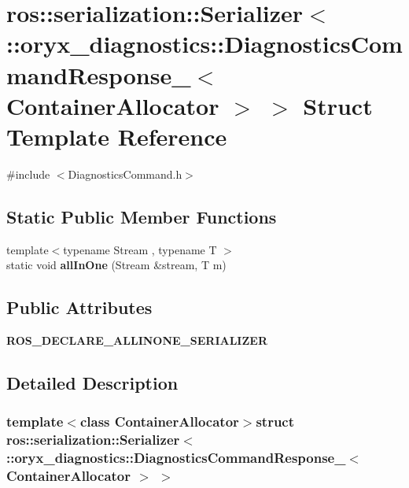 \section{ros\-:\-:serialization\-:\-:\-Serializer$<$ \-:\-:oryx\-\_\-diagnostics\-:\-:\-Diagnostics\-Command\-Response\-\_\-$<$ \-Container\-Allocator $>$ $>$ \-Struct \-Template \-Reference}
\label{structros_1_1serialization_1_1Serializer_3_01_1_1oryx__diagnostics_1_1DiagnosticsCommandResponse9f8c5441d0c58d15b0b5a048fd53cb94}


{\ttfamily \#include $<$\-Diagnostics\-Command.\-h$>$}

\subsection*{\-Static \-Public \-Member \-Functions}
\begin{DoxyCompactItemize}
\item 
{\footnotesize template$<$typename Stream , typename T $>$ }\\static void {\bf all\-In\-One} (\-Stream \&stream, \-T m)
\end{DoxyCompactItemize}
\subsection*{\-Public \-Attributes}
\begin{DoxyCompactItemize}
\item 
{\bf \-R\-O\-S\-\_\-\-D\-E\-C\-L\-A\-R\-E\-\_\-\-A\-L\-L\-I\-N\-O\-N\-E\-\_\-\-S\-E\-R\-I\-A\-L\-I\-Z\-E\-R}
\end{DoxyCompactItemize}


\subsection{\-Detailed \-Description}
\subsubsection*{template$<$class Container\-Allocator$>$struct ros\-::serialization\-::\-Serializer$<$ \-::oryx\-\_\-diagnostics\-::\-Diagnostics\-Command\-Response\-\_\-$<$ Container\-Allocator $>$ $>$}



